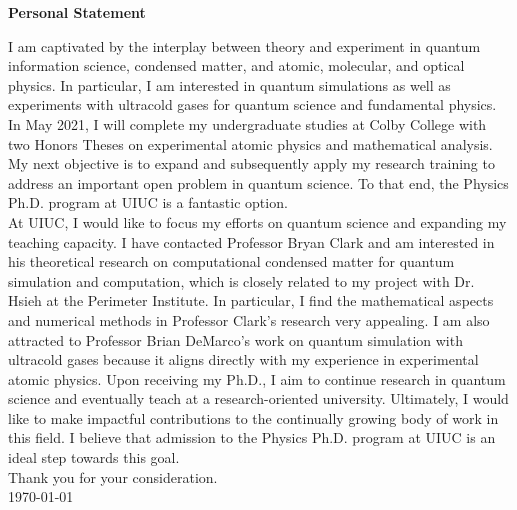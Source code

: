 \documentclass[12pt]{article}
\begin{document}
\begin{center}
	\textbf{Personal Statement}
\end{center}
I am captivated by the interplay between theory and experiment in quantum information science, condensed matter, and atomic, molecular, and optical physics. In particular, I am interested in quantum simulations as well as experiments with ultracold gases for quantum science and fundamental physics. In May 2021, I will complete my undergraduate studies at Colby College with two Honors Theses on experimental atomic physics and mathematical analysis. My next objective is to expand and subsequently apply my research training to address an important open problem in quantum science. To that end, the Physics Ph.D. program at UIUC is a fantastic option.  \\ 





At UIUC, I would like to focus my efforts on quantum science and expanding my teaching capacity. I have contacted Professor Bryan Clark and am interested in his theoretical research on computational condensed matter for quantum simulation and computation, which is closely related to my project with Dr. Hsieh at the Perimeter Institute. In particular, I find the mathematical aspects and numerical methods in Professor Clark's research very appealing. I am also attracted to Professor Brian DeMarco's work on quantum simulation with ultracold gases because it aligns directly with my experience in experimental atomic physics. Upon receiving my Ph.D., I aim to continue research in quantum science and eventually teach at a research-oriented university. Ultimately, I would like to make impactful contributions to the continually growing body of work in this field. I believe that admission to the Physics Ph.D. program at UIUC is an ideal step towards this goal. \\

\noindent Thank you for your consideration. \\

\noindent \today\\

	











	
	
	
	
	
\end{document}

